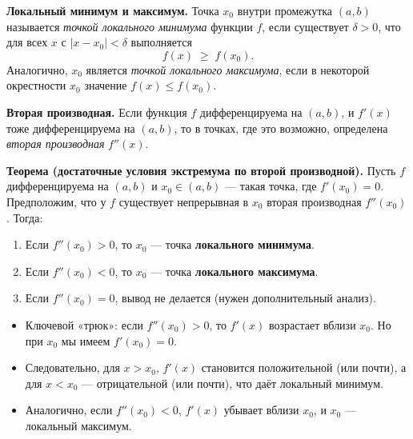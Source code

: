 

\textbf{Локальный минимум и максимум.}
Точка $x_0$ внутри промежутка $(a,b)$ называется \emph{точкой локального минимума} функции $f$, если существует $\delta>0$, что для всех $x$ с $|x-x_0|<\delta$ выполняется
\[
f(x)\;\ge\;f(x_0).
\]
Аналогично, $x_0$ является \emph{точкой локального максимума}, если в некоторой окрестности $x_0$ значение $f(x)\le f(x_0)$.

\medskip

\textbf{Вторая производная.}
Если функция $f$ дифференцируема на $(a,b)$, и $f'(x)$ тоже дифференцируема на $(a,b)$, то в точках, где это возможно, определена \emph{вторая производная} $f''(x)$.

\medskip


\textbf{Теорема (достаточные условия экстремума по второй производной).}
Пусть $f$ дифференцируема на $(a,b)$ и $x_0 \in (a,b)$ — такая точка, где $f'(x_0)=0$. Предположим, что у $f$ существует непрерывная в $x_0$ вторая производная $f''(x_0)$. Тогда:
\begin{enumerate}
  \item Если $f''(x_0)>0$, то $x_0$ — точка \textbf{локального минимума}.
  \item Если $f''(x_0)<0$, то $x_0$ — точка \textbf{локального максимума}.
  \item Если $f''(x_0)=0$, вывод не делается (нужен дополнительный анализ).
\end{enumerate}

\medskip


\begin{itemize}
  \item Ключевой «трюк»: если $f''(x_0)>0$, то $f'(x)$ возрастает вблизи $x_0$. Но при $x_0$ мы имеем $f'(x_0)=0$.  
  \item Следовательно, для $x>x_0$, $f'(x)$ становится положительной (или почти), а для $x<x_0$ — отрицательной (или почти), что даёт локальный минимум.  
  \item Аналогично, если $f''(x_0)<0$, $f'(x)$ убывает вблизи $x_0$, и $x_0$ — локальный максимум.
\end{itemize}

\medskip


